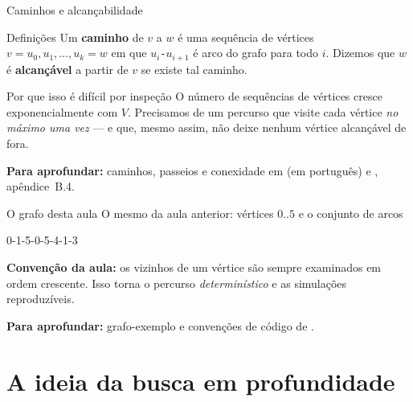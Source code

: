\documentclass[aspectratio=169]{beamer}
\newcommand{\fonte}[1]{%
  \vfill
  {\tiny\color{gray!55!black}\textbf{Para aprofundar:} #1\par}%
}
\begin{document}
\begin{frame}{Caminhos e alcançabilidade}
  \begin{block}{Definições}
    {\small Um \textbf{caminho} de $v$ a $w$ é uma sequência de vértices
    $v = u_0, u_1, \ldots, u_k = w$ em que $u_{i}$\texttt{-}$u_{i+1}$ é arco do
    grafo para todo $i$. Dizemos que $w$ é \textbf{alcançável} a partir de $v$
    se existe tal caminho.}
  \end{block}
  \begin{exampleblock}{Por que isso é difícil por inspeção}
    {\small O número de sequências de vértices cresce exponencialmente com $V$.
    Precisamos de um percurso que visite cada vértice \emph{no máximo uma vez} ---
    e que, mesmo assim, não deixe nenhum vértice alcançável de fora.}
  \end{exampleblock}
  \fonte{caminhos, passeios e conexidade em \cite{feofiloff2011teoriagrafos}
  (em português) e \cite{cormen2009introduction}, apêndice~B.4.}
\end{frame}

\begin{frame}{O grafo desta aula}
  {\small O mesmo da aula anterior: vértices $0..5$ e o conjunto de arcos}
  \begin{center}\ttfamily\small 0-1-5-0-5-4-1-3\end{center}
  \begin{center}
  \end{center}
  {\scriptsize \textbf{Convenção da aula:} os vizinhos de um vértice são sempre
  examinados em ordem crescente. Isso torna o percurso \emph{determinístico} e
  as simulações reproduzíveis.}
  \fonte{grafo-exemplo e convenções de código de \cite{feofiloff2020algoritmos}.}
\end{frame}

\section{A ideia da busca em profundidade}
\end{document}
